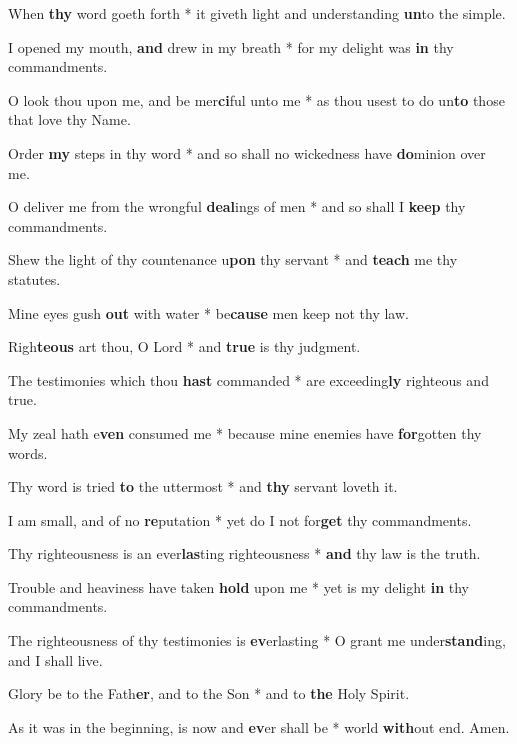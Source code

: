 \begin{multicols}{2}
	When \textbf{thy} word goeth forth * it giveth light and understanding \textbf{un}to the simple.
	
	I opened my mouth, \textbf{and} drew in my breath * for my delight was \textbf{in} thy commandments.
	
	O look thou upon me, and be mer\textbf{ci}ful unto me * as thou usest to do un\textbf{to} those that love thy Name.
	
	Order \textbf{my} steps in thy word * and so shall no wickedness have \textbf{do}minion over me.
	
	O deliver me from the wrongful \textbf{deal}ings of men * and so shall I \textbf{keep} thy commandments.
	
	Shew the light of thy countenance u\textbf{pon} thy servant * and \textbf{teach} me thy statutes.
	
	Mine eyes gush \textbf{out} with water * be\textbf{cause} men keep not thy law.
	
	Righ\textbf{teous} art thou, O Lord * and \textbf{true} is thy judgment.
	
	The testimonies which thou \textbf{hast} commanded * are exceeding\textbf{ly} righteous and true.
	
	My zeal hath e\textbf{ven} consumed me * because mine enemies have \textbf{for}gotten thy words.
	
	Thy word is tried \textbf{to} the uttermost * and \textbf{thy} servant loveth it.
	
	I am small, and of no \textbf{re}putation * yet do I not for\textbf{get} thy commandments.
	
	Thy righteousness is an ever\textbf{las}ting righteousness * \textbf{and} thy law is the truth.
	
	Trouble and heaviness have taken \textbf{hold} upon me * yet is my delight \textbf{in} thy commandments.
	
	The righteousness of thy testimonies is \textbf{ev}erlasting * O grant me under\textbf{stand}ing, and I shall live.
	
	Glory be to the Fath\textbf{er}, and to the Son * and to \textbf{the} Holy Spirit.
	
	As it was in the beginning, is now and \textbf{ev}er shall be * world \textbf{with}out end. Amen.
\end{multicols}